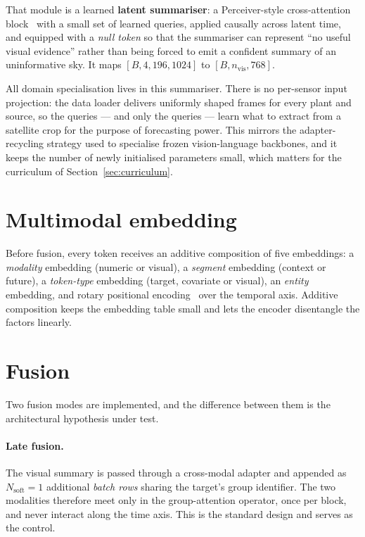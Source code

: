 That module is a learned \textbf{latent summariser}: a Perceiver-style cross-attention
block~\cite{perceiver} with a small set of learned queries, applied causally across latent
time, and equipped with a \emph{null token} so that the summariser can represent ``no useful
visual evidence'' rather than being forced to emit a confident summary of an uninformative
sky. It maps $[B,4,196,1024]$ to $[B, n_{\text{vis}}, 768]$.

All domain specialisation lives in this summariser. There is no per-sensor input projection:
the data loader delivers uniformly shaped frames for every plant and source, so the queries
--- and only the queries --- learn what to extract from a satellite crop for the purpose of
forecasting power. This mirrors the adapter-recycling strategy used to specialise frozen
vision-language backbones, and it keeps the number of newly initialised parameters small,
which matters for the curriculum of Section~\ref{sec:curriculum}.

\section{Multimodal embedding}
\label{sec:embedding}

Before fusion, every token receives an additive composition of five embeddings: a
\emph{modality} embedding (numeric or visual), a \emph{segment} embedding (context or
future), a \emph{token-type} embedding (target, covariate or visual), an \emph{entity}
embedding, and rotary positional encoding~\cite{rope} over the temporal axis. Additive
composition keeps the embedding table small and lets the encoder disentangle the factors
linearly.

\section{Fusion}
\label{sec:interleaving}

Two fusion modes are implemented, and the difference between them is the architectural
hypothesis under test.

\paragraph{Late fusion.} The visual summary is passed through a cross-modal adapter and
appended as $N_{\text{soft}}=1$ additional \emph{batch rows} sharing the target's group
identifier. The two modalities therefore meet only in the group-attention operator, once per
block, and never interact along the time axis. This is the standard design and serves as the
control.

